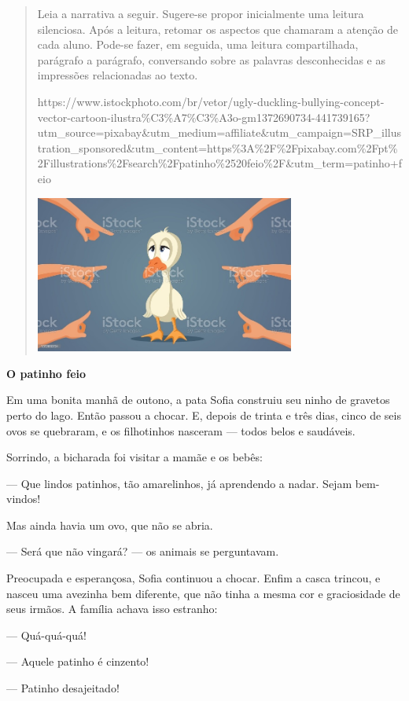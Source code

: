\begin{escolha}
\begin{escolha}
{\begin{quote}
Leia a narrativa a seguir. Sugere-se propor inicialmente uma leitura
silenciosa. Após a leitura, retomar os aspectos que chamaram a atenção
de cada aluno. Pode-se fazer, em seguida, uma leitura compartilhada,
parágrafo a parágrafo, conversando sobre as palavras desconhecidas e as
impressões relacionadas ao texto.

https://www.istockphoto.com/br/vetor/ugly-duckling-bullying-concept-vector-cartoon-ilustra\%C3\%A7\%C3\%A3o-gm1372690734-441739165?utm\_source=pixabay\&utm\_medium=affiliate\&utm\_campaign=SRP\_illustration\_sponsored\&utm\_content=https\%3A\%2F\%2Fpixabay.com\%2Fpt\%2Fillustrations\%2Fsearch\%2Fpatinho\%2520feio\%2F\&utm\_term=patinho+feio

\includegraphics[width=3.35140in,height=2.03748in]{media/image36.jpeg}
\end{quote}

\textbf{O patinho feio}

Em uma bonita manhã de outono, a pata Sofia construiu seu ninho de
gravetos perto do lago. Então passou a chocar. E, depois de trinta e
três dias, cinco de seis ovos se quebraram, e os filhotinhos nasceram
--- todos belos e saudáveis.

Sorrindo, a bicharada foi visitar a mamãe e os bebês:

--- Que lindos patinhos, tão amarelinhos, já aprendendo a nadar. Sejam
bem-vindos!

Mas ainda havia um ovo, que não se abria.

--- Será que não vingará? --- os animais se perguntavam.

Preocupada e esperançosa, Sofia continuou a chocar. Enfim a casca
trincou, e nasceu uma avezinha bem diferente, que não tinha a mesma cor
e graciosidade de seus irmãos. A família achava isso estranho:

--- Quá-quá-quá!

--- Aquele patinho é cinzento!

--- Patinho desajeitado!

}
\end{escolha}
\end{escolha}
